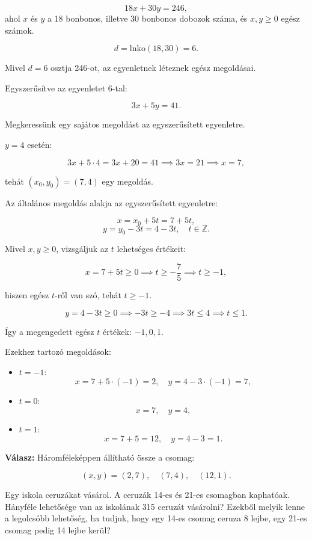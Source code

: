 \begin{solution}
\[
18x+30y=246,
\]
ahol $x$ és $y$ a 18 bonbonos, illetve 30 bonbonos dobozok száma,
és $x,y\geq0$ egész számok.

\bigskip{}

\[
d=\mathrm{lnko}(18,30)=6.
\]

Mivel $d=6$ osztja 246-ot, az egyenletnek léteznek egész megoldásai.

\bigskip{}

Egyszerűsítve az egyenletet 6-tal:

\[
3x+5y=41.
\]

\bigskip{}

Megkeressünk egy sajátos megoldást az egyszerűsített egyenletre.

$y=4$ esetén:

\[
3x+5\cdot4=3x+20=41\implies3x=21\implies x=7,
\]

tehát $(x_{0},y_{0})=(7,4)$ egy megoldás.

\bigskip{}

Az általános megoldás alakja az egyszerűsített egyenletre:

\[
x=x_{0}+5t=7+5t,
\]
\[
y=y_{0}-3t=4-3t,\quad t\in\mathbb{Z}.
\]

\bigskip{}

Mivel $x,y\geq0$, vizsgáljuk az $t$ lehetséges értékeit:

\[
x=7+5t\geq0\implies t\geq-\frac{7}{5}\implies t\geq-1,
\]

hiszen egész $t$-ről van szó, tehát $t\geq-1$.

\[
y=4-3t\geq0\implies-3t\geq-4\implies3t\leq4\implies t\leq1.
\]

\bigskip{}

Így a megengedett egész $t$ értékek: $-1,0,1$.

\bigskip{}

Ezekhez tartozó megoldások:
\begin{itemize}
\item $t=-1$: 
\[
x=7+5\cdot(-1)=2,\quad y=4-3\cdot(-1)=7,
\]
\item $t=0$: 
\[
x=7,\quad y=4,
\]
\item $t=1$: 
\[
x=7+5=12,\quad y=4-3=1.
\]
\end{itemize}
\bigskip{}

\textbf{Válasz:} Háromféleképpen állítható össze a csomag:

\[
(x,y)=(2,7),\quad(7,4),\quad(12,1).
\]
\end{solution}
\begin{problem}
Egy iskola ceruzákat vásárol. A ceruzák 14-es és 21-es csomagban kaphatóak.
Hányféle lehetősége van az iskolának 315 ceruzát vásárolni? Ezekből
melyik lenne a legolcsóbb lehetőség, ha tudjuk, hogy egy 14-es csomag
ceruza 8 lejbe, egy 21-es csomag pedig 14 lejbe kerül? 
\end{problem}

